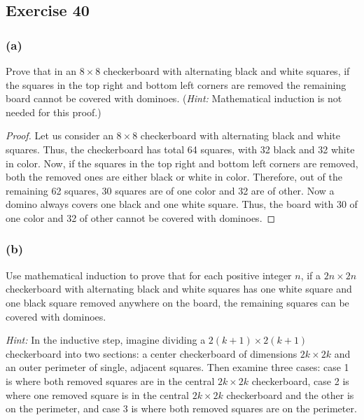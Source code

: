 \documentclass[14pt]{extarticle}
\begin{document}
\subsection{Exercise 40}
\subsubsection{(a)}
Prove that in an $8 \times 8$ checkerboard with alternating black and white squares, if the squares in the top right and bottom left corners are removed the remaining board cannot be covered with dominoes. ({\it Hint:} Mathematical induction is not needed for this proof.)

\begin{proof}
Let us consider an $8 \times 8$ checkerboard with alternating black and white squares. Thus, the checkerboard has total 64 squares, with 32 black and 32 white in color. Now, if the squares in the top right and bottom left corners are removed, both the removed ones are either black or white in color. Therefore, out of the remaining 62 squares, 30 squares are of one color and 32 are of other. Now a domino always covers one black and one white square. Thus, the board with 30 of one color and 32 of other cannot be covered with dominoes.
\end{proof}

\subsubsection{(b)}
Use mathematical induction to prove that for each positive integer $n$, if a $2n \times 2n$ checkerboard with alternating black and white squares has one white square and one black square removed anywhere on the board, the remaining squares can be covered with dominoes.

{\it Hint:} In the inductive step, imagine dividing a $2(k + 1) \times 2(k + 1)$ checkerboard into two sections: a center checkerboard of dimensions $2k \times 2k$ and an outer perimeter of single, adjacent squares. Then examine three cases: case 1 is where both removed squares are in the central $2k \times 2k$ checkerboard, case 2 is where one removed square is in the central $2k \times 2k$ checkerboard and the other is on the perimeter, and case 3 is where both removed squares are on the perimeter.
\end{document}
